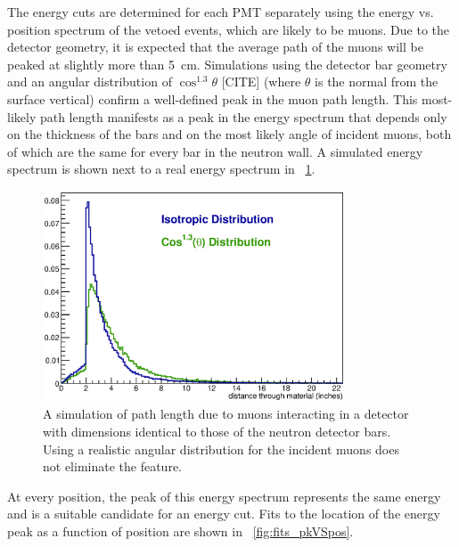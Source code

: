 The energy cuts are determined for each PMT separately using the energy vs. position spectrum of the vetoed events, which are likely to be muons.  Due to the detector geometry, it is expected that the average path of the muons will be peaked at slightly more than 5~cm.  Simulations using the detector bar geometry and an angular distribution of $\cos^{1.3}{\theta}$ [CITE] (where $\theta$ is the normal from the surface vertical) confirm a well-defined peak in the muon path length. This most-likely path length manifests as a peak in the energy spectrum that depends only on the thickness of the bars and on the most likely angle of incident muons, both of which are the same for every bar in the neutron wall.  A simulated energy spectrum is shown next to a real energy spectrum in {\fig}~\ref{fig:muonSpectrum}. 
\begin{figure}[!htbp]
\centering
\includegraphics[width=0.8\textwidth]{figures/flatVSaccurate_cosmicDist.eps}
\caption{A simulation of path length due to muons interacting in a detector with dimensions identical to those of the neutron detector bars.  Using a realistic angular distribution for the incident muons does not eliminate the feature.}
\label{fig:muonSpectrum}
\end{figure}
At every position, the peak of this energy spectrum represents the same energy and is a suitable candidate for an energy cut.  Fits to the location of the energy peak as a function of position are shown in {\fig}~\ref{fig:fits_pkVSpos}.
